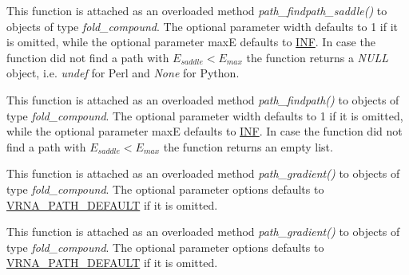 \begin{DoxyRefList}
\item[\label{wrappers__wrappers000064}%
\Hypertarget{wrappers__wrappers000064}%
Global \mbox{\hyperlink{group__direct__paths_gada8d722e37401b1aea30128b07555771}{vrna\+\_\+path\+\_\+findpath\+\_\+saddle\+\_\+ub}} (vrna\+\_\+fold\+\_\+compound\+\_\+t $\ast$vc, const char $\ast$s1, const char $\ast$s2, int width, int maxE)]This function is attached as an overloaded method {\itshape path\+\_\+findpath\+\_\+saddle()} to objects of type {\itshape fold\+\_\+compound}. The optional parameter {\ttfamily width} defaults to 1 if it is omitted, while the optional parameter {\ttfamily maxE} defaults to \mbox{\hyperlink{energy__const_8h_a12c2040f25d8e3a7b9e1c2024c618cb6}{I\+NF}}. In case the function did not find a path with $E_{saddle} < E_{max}$ the function returns a {\itshape N\+U\+LL} object, i.\+e. {\itshape undef} for Perl and {\itshape None} for Python.  
\item[\label{wrappers__wrappers000066}%
\Hypertarget{wrappers__wrappers000066}%
Global \mbox{\hyperlink{group__direct__paths_ga8d47812616303f40057dfb033869863a}{vrna\+\_\+path\+\_\+findpath\+\_\+ub}} (vrna\+\_\+fold\+\_\+compound\+\_\+t $\ast$vc, const char $\ast$s1, const char $\ast$s2, int width, int maxE)]This function is attached as an overloaded method {\itshape path\+\_\+findpath()} to objects of type {\itshape fold\+\_\+compound}. The optional parameter {\ttfamily width} defaults to 1 if it is omitted, while the optional parameter {\ttfamily maxE} defaults to \mbox{\hyperlink{energy__const_8h_a12c2040f25d8e3a7b9e1c2024c618cb6}{I\+NF}}. In case the function did not find a path with $E_{saddle} < E_{max}$ the function returns an empty list.  
\item[\label{wrappers__wrappers000094}%
\Hypertarget{wrappers__wrappers000094}%
Global \mbox{\hyperlink{group__paths_gae92cce443a8a64f7b7fb89867b7d6125}{vrna\+\_\+path\+\_\+gradient}} (vrna\+\_\+fold\+\_\+compound\+\_\+t $\ast$vc, short $\ast$pt, unsigned int options)]This function is attached as an overloaded method {\itshape path\+\_\+gradient()} to objects of type {\itshape fold\+\_\+compound}. The optional parameter {\ttfamily options} defaults to \mbox{\hyperlink{group__paths_gaf1bb1f8fec8d24e3b821f621b19f77b4}{V\+R\+N\+A\+\_\+\+P\+A\+T\+H\+\_\+\+D\+E\+F\+A\+U\+LT}} if it is omitted.  
\item[\label{wrappers__wrappers000095}%
\Hypertarget{wrappers__wrappers000095}%
Global \mbox{\hyperlink{group__paths_ga9234756c337078fa599529d3db70d913}{vrna\+\_\+path\+\_\+random}} (vrna\+\_\+fold\+\_\+compound\+\_\+t $\ast$vc, short $\ast$pt, unsigned int steps, unsigned int options)]This function is attached as an overloaded method {\itshape path\+\_\+gradient()} to objects of type {\itshape fold\+\_\+compound}. The optional parameter {\ttfamily options} defaults to \mbox{\hyperlink{group__paths_gaf1bb1f8fec8d24e3b821f621b19f77b4}{V\+R\+N\+A\+\_\+\+P\+A\+T\+H\+\_\+\+D\+E\+F\+A\+U\+LT}} if it is omitted.  

\end{DoxyRefList}
